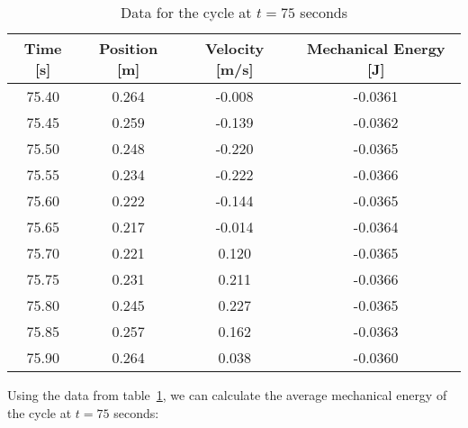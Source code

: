 \documentclass[titlepage]{article}
\begin{document}
            \begin{table}[H]
                \small
                \centering
                \begin{tabular}{|c|c|c|c|}
                    \hline
                    Time [s] & Position [m] & Velocity [m/s] & Mechanical Energy [J] \\
                    \hline
                    75.40    & 0.264        & -0.008         & -0.0361               \\
                    \hline
                    75.45    & 0.259        & -0.139         & -0.0362               \\
                    \hline
                    75.50    & 0.248        & -0.220         & -0.0365               \\
                    \hline
                    75.55    & 0.234        & -0.222         & -0.0366               \\
                    \hline
                    75.60    & 0.222        & -0.144         & -0.0365               \\
                    \hline
                    75.65    & 0.217        & -0.014         & -0.0364               \\
                    \hline
                    75.70    & 0.221        & 0.120          & -0.0365               \\
                    \hline
                    75.75    & 0.231        & 0.211          & -0.0366               \\
                    \hline
                    75.80    & 0.245        & 0.227          & -0.0365               \\
                    \hline
                    75.85    & 0.257        & 0.162          & -0.0363               \\
                    \hline
                    75.90    & 0.264        & 0.038          & -0.0360               \\
                    \hline
                \end{tabular}
                \caption{Data for the cycle at $t=75$ seconds}\label{tab:cycle-at-75-seconds-mechanical-energy-table}
            \end{table}
            
            Using the data from table~\ref{tab:cycle-at-75-seconds-mechanical-energy-table}, we can calculate the average mechanical energy of the cycle at $t=75$ seconds:
            
\end{document}

